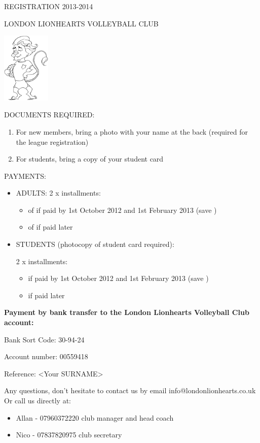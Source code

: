 \normalsize
\begin{center}
REGISTRATION 2013-2014

LONDON LIONHEARTS VOLLEYBALL CLUB
\vspace{0.5cm}

\includegraphics[width=2.3cm]{lions.png}
\end{center}

DOCUMENTS REQUIRED:
\begin{enumerate}
  \item For new members, bring a photo with your name at the back
(required for the league registration)
 \item For students, bring a copy of your student card
\end{enumerate}


PAYMENTS:
\begin{itemize}
\item ADULTS:
2 x installments:
\begin{itemize}
  \item of  if paid by 1st October 2012 and 1st February 2013 (save )
  \item of  if paid later
\end{itemize}

\item STUDENTS (photocopy of student card required):

2 x installments:
\begin{itemize}
  \item {} if paid by 1st October 2012 and 1st February 2013 (save )
  \item {} if paid later
\end{itemize}
\end{itemize}

{\bfseries Payment by bank transfer to the London Lionhearts Volleyball Club account:}

Bank Sort Code: 30-94-24

Account number: 00559418

Reference: <Your SURNAME>

Any questions, don't hesitate to contact us by email info@londonlionhearts.co.uk
Or call us directly at:

\begin{itemize}
  \item Allan - 07960372220	club manager and head coach
  \item Nico - 07837820975	club secretary
\end{itemize}
\newpage



